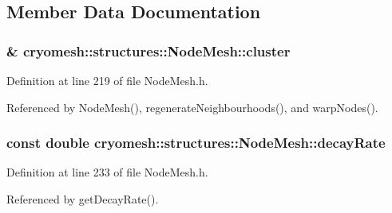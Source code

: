 \subsection{\-Member \-Data \-Documentation}
\hypertarget{classcryomesh_1_1structures_1_1NodeMesh_a0f94d9777f9f9e2533b64881d59c225e}{
\subsubsection[{cluster}]{\& {\bf cryomesh\-::structures\-::\-Node\-Mesh\-::cluster}}}\label{classcryomesh_1_1structures_1_1NodeMesh_a0f94d9777f9f9e2533b64881d59c225e}


\-Definition at line 219 of file \-Node\-Mesh.\-h.



\-Referenced by \-Node\-Mesh(), regenerate\-Neighbourhoods(), and warp\-Nodes().

\hypertarget{classcryomesh_1_1structures_1_1NodeMesh_aa7ce39158d506dcda63859ca1afb08dc}{
\subsubsection[{decay\-Rate}]{\setlength{\rightskip}{0pt plus 5cm}const double {\bf cryomesh\-::structures\-::\-Node\-Mesh\-::decay\-Rate}}}\label{classcryomesh_1_1structures_1_1NodeMesh_aa7ce39158d506dcda63859ca1afb08dc}


\-Definition at line 233 of file \-Node\-Mesh.\-h.



\-Referenced by get\-Decay\-Rate().

